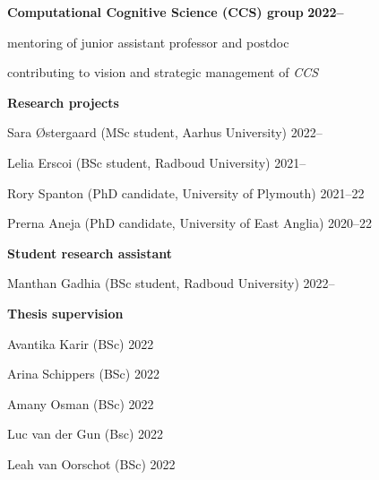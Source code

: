 \documentclass[10pt]{article}
\newenvironment{outerlist}[1][\enskip\textbullet]%
        {\begin{itemize}[#1]}{\end{itemize}%
         \vspace{-.6\baselineskip}}
\newenvironment{innerlist}[1][\enskip\textbullet]%
        {\begin{compactitem}[#1]}{\end{compactitem}}
\begin{document}
\begin{outerlist}
 
    
     \item[\textbf{Computational Cognitive Science (CCS) group}] \hfill \textbf{2022--}

      \begin{innerlist}
       \item mentoring of junior assistant professor and postdoc
       \item contributing to vision and strategic management of \textit{CCS} 
    \end{innerlist}  
    
    

    \item[\textbf{Research projects}] \hfill
      \begin{innerlist}
        \item Sara Østergaard (MSc student, Aarhus University) \hfill 2022--
        \item Lelia Erscoi (BSc student, Radboud University) \hfill 2021--
        \item Rory Spanton (PhD candidate, University of Plymouth) \hfill 2021--22
        \item Prerna Aneja (PhD candidate, University of East Anglia) \hfill 2020--22
    \end{innerlist}  

    \item[\textbf{Student research assistant}] \hfill
      \begin{innerlist}
        \item Manthan Gadhia (BSc student, Radboud University) \hfill 2022--
    \end{innerlist}  
  
      \item[\textbf{Thesis supervision}] \hfill
      \begin{innerlist}
        \item Avantika Karir (BSc) \hfill 2022
        \item Arina Schippers (BSc) \hfill 2022
        \item Amany Osman (BSc) \hfill 2022
        \item Luc van der Gun (Bsc) \hfill 2022
        \item Leah van Oorschot (BSc) \hfill 2022
        

\end{innerlist}
\end{outerlist}
\end{document}
